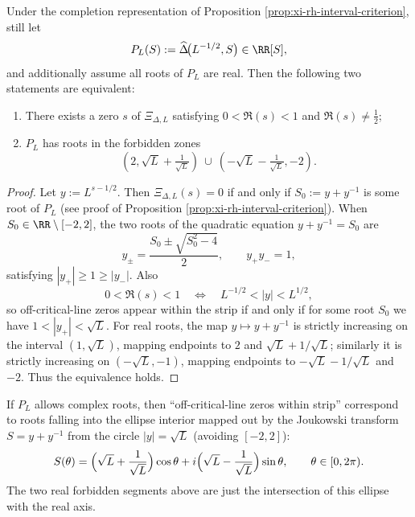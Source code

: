 \begin{proposition}\label{prop:xi-strip-forbidden-real}
Under the completion representation of Proposition \ref{prop:xi-rh-interval-criterion}, still let
\[
P_L(S):=\widehat\Delta\!\bigl(L^{-1/2},S\bigr)\in\RR[S],
\]
and additionally assume all roots of \(P_L\) are real.
Then the following two statements are equivalent:
\begin{enumerate}
  \item There exists a zero \(s\) of \(\Xi_{\Delta,L}\) satisfying \(0<\Re(s)<1\) and \(\Re(s)\neq \tfrac12\);
  \item \(P_L\) has roots in the forbidden zones
  \[
  (2,\sqrt{L}+\tfrac{1}{\sqrt{L}})\ \cup\ (-\sqrt{L}-\tfrac{1}{\sqrt{L}},-2).
  \]
\end{enumerate}
\end{proposition}
\begin{proof}
Let \(y:=L^{s-1/2}\). Then \(\Xi_{\Delta,L}(s)=0\) if and only if \(S_0:=y+y^{-1}\) is some root of \(P_L\) (see proof of Proposition \ref{prop:xi-rh-interval-criterion}).
When \(S_0\in\RR\setminus[-2,2]\), the two roots of the quadratic equation \(y+y^{-1}=S_0\) are
\[
y_\pm=\frac{S_0\pm\sqrt{S_0^2-4}}{2},\qquad y_+y_-=1,
\]
satisfying \(|y_+|\ge 1\ge |y_-|\).
Also
\[
0<\Re(s)<1\quad\Longleftrightarrow\quad L^{-1/2}<|y|<L^{1/2},
\]
so off-critical-line zeros appear within the strip if and only if for some root \(S_0\) we have \(1<|y_+|<\sqrt{L}\).
For real roots, the map \(y\mapsto y+y^{-1}\) is strictly increasing on the interval \((1,\sqrt{L})\), mapping endpoints to \(2\) and \(\sqrt{L}+1/\sqrt{L}\);
similarly it is strictly increasing on \((-\sqrt{L},-1)\), mapping endpoints to \(-\sqrt{L}-1/\sqrt{L}\) and \(-2\).
Thus the equivalence holds.
\end{proof}

\begin{remark}\label{rem:xi-strip-ellipse-forbidden}
If \(P_L\) allows complex roots, then ``off-critical-line zeros within strip'' correspond to roots falling into the ellipse interior mapped out by the Joukowski transform \(S=y+y^{-1}\) from the circle \(|y|=\sqrt{L}\) (avoiding \([-2,2]\)):
\[
S(\theta)=\Bigl(\sqrt{L}+\frac{1}{\sqrt{L}}\Bigr)\cos\theta
+i\Bigl(\sqrt{L}-\frac{1}{\sqrt{L}}\Bigr)\sin\theta,\qquad \theta\in[0,2\pi).
\]
The two real forbidden segments above are just the intersection of this ellipse with the real axis.
\end{remark}

